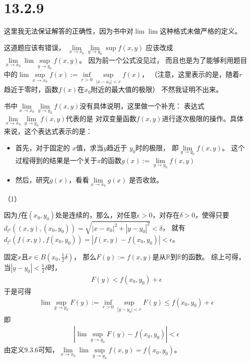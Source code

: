 \documentclass{article}
\begin{document}
\section*{13.2.9}

这里我无法保证解答的正确性，因为书中对$\lim\lim$这种格式未做严格的定义。

\begin{zremark}
  这道题应该有错误，
  $\lim\limits_{x \to x_0}\lim\limits_{y \to y_0}\sup f(x, y)$
  应该改成
  $\lim \limits_{x \to x_0}\lim \sup \limits_{y \to y_0}f(x, y)$。
  因为前一个公式没见过，
  而且也是为了能够利用题目中的$\lim \sup \limits_{x \to x_0}f(x) := \inf \limits_{r > 0} \sup \limits_{|x - x_0| < r} f(x)$，
  （注意，这里表示的是，随着$r$趋近于零时，函数$f(x)$在$x_0$附近的最大值的极限）
  不然我证明不出来。
\end{zremark}
\begin{zremark}
  书中$\lim\limits_{x \to x_0}\lim\limits_{y \to y_0}f(x, y)$没有具体说明，这里做一个补充：
  表达式$\lim\limits_{x \to x_0}\lim\limits_{y \to y_0}f(x, y)$代表的是
  对双变量函数$f(x,y)$进行逐次极限的操作。具体来说，这个表达式表示的是：
  \begin{itemize}
    \item 首先，对于固定的
          $x$值，求当$y$趋近于 $y_0$时的极限，
          即$\lim\limits_{y \to y_0}f(x,y)$。
          这个过程得到的结果是一个关于$x$的函数$g(x) := \lim\limits_{y \to y_0}f(x,y)$

    \item 然后，研究$g(x)$，看看$\lim\limits_{x \to x_0} g(x)$ 是否收敛。
  \end{itemize}
\end{zremark}

（1）

因为$f$在$(x_0, y_0)$处是连续的，那么，对任意$\epsilon > 0$，对存在$\delta > 0$，使得只要
$d_{l^2}((x, y), (x_0, y_0)) = \sqrt{|x - x_0|^2 + |y - y_0|^2} < \delta$，
就有$d_{l^2}(f(x, y), f(x_0, y_0)) = |f(x, y) - f(x_0, y_0)| < \epsilon$。

固定$x$且$x \in B(x_0, \frac{1}{2}\delta)$，
那么$F(y) := f(x, y)$是从$\mathbb{R}$到$\mathbb{R}$的函数。
综上可得，当$|y - y_0| < \frac{1}{2}\delta$时，
\begin{align*}
  F(y) < f(x_0, y_0) + \epsilon
\end{align*}
于是可得
\begin{align*}
  \lim \sup \limits_{y \to y_0}F(y) := \inf \limits_{r > 0} \sup \limits_{|y - y_0| < r} F(y) \leq f(x_0, y_0) + \epsilon
\end{align*}
即
\begin{align*}
  |\lim \sup \limits_{y \to y_0}F(y) - f(x_0, y_0)| < \epsilon
\end{align*}
由定义9.3.6可知，$\lim \limits_{x \to x_0}\lim \sup \limits_{y \to y_0}f(x, y) = f(x_0, y_0)$。
\end{document}
